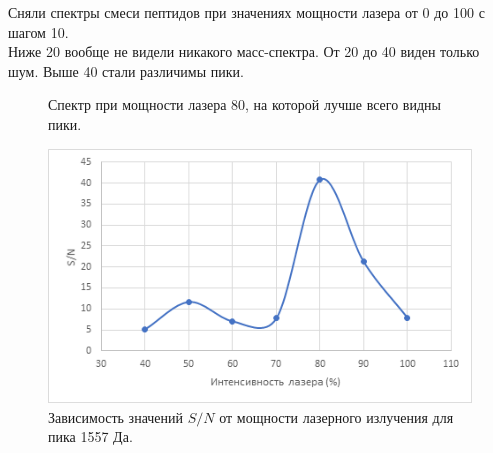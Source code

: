 \documentclass[12pt]{article}
\begin{document}
\begin{flushleft}
Сняли спектры смеси пептидов при значениях мощности лазера от 0 до 100 с шагом 10. \\
Ниже 20 вообще не видели никакого масс-спектра. От 20 до 40 виден только шум. Выше 40 стали различимы пики.
\begin{figure}[!h]
\caption{Спектр при мощности лазера 80, на которой лучше всего видны пики.}
\label{ris:image}
\end{figure}
\newpage
\begin{figure}[!h]
\begin{center}
\begin{minipage}[h]{0.4\linewidth}
\includegraphics[width=1.2\linewidth]{3}
\caption{Зависимость значений $S/N$ от мощности лазерного излучения
для пика 1557 Да.} %
\label{ris:experimoriginal} %
\end{minipage}
\hfill 
\begin{minipage}[h]{0.4\linewidth}

\end{minipage}
\end{center}
\end{figure}
\end{flushleft}
\end{document}
